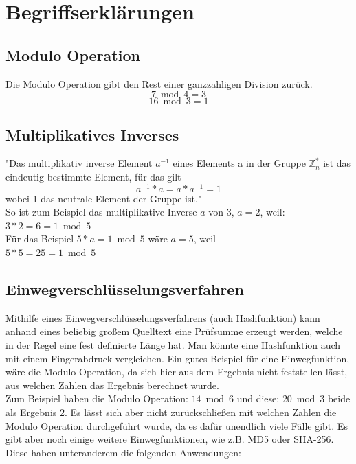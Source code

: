 \documentclass[12pt,a4paper]{scrartcl}
\begin{document}
\pagebreak


\section{Begriffserklärungen}
	\subsection{Modulo Operation} %
	Die Modulo Operation gibt den Rest einer ganzzahligen Division zurück.
	$$ {7 \bmod 4 = 3} $$
	$$ {16 \bmod 3 = 1} $$
	
	\subsection{Multiplikatives Inverses}
	"Das multiplikativ inverse Element $a^{-1}$ eines Elements a in der Gruppe $\mathbb{Z}_n ^*$ ist das eindeutig bestimmte Element, für das gilt $${a^{-1} * a  =  a * a^{-1}  =  1}$$ wobei 1 das neutrale Element der Gruppe ist." \cite{hwlang} \\
	
	So ist zum Beispiel das multiplikative Inverse $a$ von 3, $a=2$, weil: \\
	${3 * 2 = 6 = 1 \bmod 5}$ \\
	
	Für das Beispiel ${5 * a = 1 \bmod 5}$ wäre $a=5$, weil \\
	${5 * 5 = 25 = 1 \bmod 5}$ \\
	
	\subsection{Einwegverschlüsselungsverfahren}
	Mithilfe eines Einwegverschlüsselungsverfahrens (auch Hashfunktion) kann anhand eines beliebig großem Quelltext eine Prüfsumme erzeugt werden, welche in der Regel eine fest definierte Länge hat. Man könnte eine Hashfunktion auch mit einem Fingerabdruck vergleichen. Ein gutes Beispiel für eine Einwegfunktion, wäre die Modulo-Operation, da sich hier aus dem Ergebnis nicht feststellen lässt, aus welchen Zahlen das Ergebnis berechnet wurde. \\
	Zum Beispiel haben die Modulo Operation: ${14 \bmod 6}$  und diese: ${20 \bmod 3}$ beide als Ergebnis 2. Es lässt sich aber nicht zurückschließen mit welchen Zahlen die Modulo Operation durchgeführt wurde, da es dafür unendlich viele Fälle gibt. Es gibt aber noch einige weitere Einwegfunktionen, wie z.B. MD5 oder SHA-256. Diese haben unteranderem die folgenden Anwendungen:
	
\end{document}
